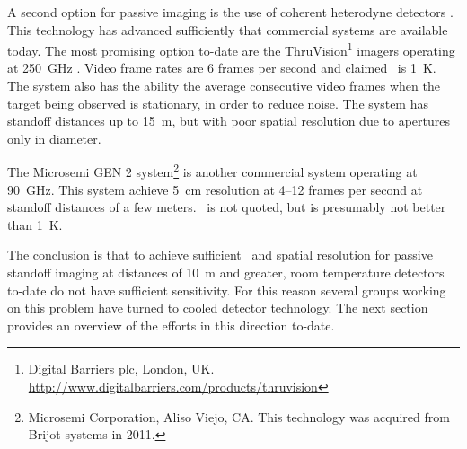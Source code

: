 A second option for passive imaging is the use of coherent heterodyne detectors \cite{rieke_detection_2003,rogalski_terahertz_2011}.
This technology has advanced sufficiently that commercial systems are available today.
The most promising option to-date are the ThruVision\footnote{Digital Barriers plc, London, UK. \url{http://www.digitalbarriers.com/products/thruvision}} imagers operating at \SI{250}{\GHz} \cite{mann_first_2009,digital_barriers_extra_????}.
Video frame rates are 6 frames per second and claimed \NETD\ is \SI{1}{\K}.
The system also has the ability the average consecutive video frames when the target being observed is stationary, in order to reduce noise.
The system has standoff distances up to \SI{15}{\m}, but with poor spatial resolution due to apertures only  in diameter.

The Microsemi GEN 2 system\footnote{%
Microsemi Corporation, Aliso Viejo, CA. This technology was acquired from Brijot systems in 2011.}
is another commercial system operating at \SI{90}{\GHz}.
This system achieve \SI{5}{\cm} resolution at 4--12 frames per second at standoff distances of a few meters.
\NETD\ is not quoted, but is presumably not better than \SI{1}{\K}.

The conclusion is that to achieve sufficient \NETD\ and spatial resolution for passive standoff imaging at distances of \SI{10}{\m} and greater, room temperature detectors to-date do not have sufficient sensitivity.
For this reason several groups working on this problem have turned to cooled detector technology.
The next section provides an overview of the efforts in this direction to-date.

% 

